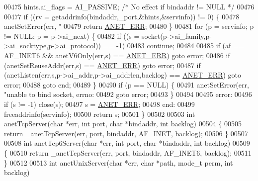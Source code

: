\begin{DoxyCode}
{{{{{{{{{{{{{{{{{{{{{{{00475     hints.ai\_flags = AI\_PASSIVE;    \textcolor{comment}{/* No effect if bindaddr != NULL */}
00476 
00477     \textcolor{keywordflow}{if} ((rv = getaddrinfo(bindaddr,\_port,&hints,&servinfo)) != 0) \{
00478         anetSetError(err, \textcolor{stringliteral}{"%
00479         \textcolor{keywordflow}{return} \hyperlink{anet_8h_a0697b7774a7e0f4ef141839fe93536fe}{ANET\_ERR};
00480     \}
00481     \textcolor{keywordflow}{for} (p = servinfo; p != NULL; p = p->ai\_next) \{
00482         \textcolor{keywordflow}{if} ((s = socket(p->ai\_family,p->ai\_socktype,p->ai\_protocol)) == -1)
00483             \textcolor{keywordflow}{continue};
00484 
00485         \textcolor{keywordflow}{if} (af == AF\_INET6 && anetV6Only(err,s) == \hyperlink{anet_8h_a0697b7774a7e0f4ef141839fe93536fe}{ANET\_ERR}) \textcolor{keywordflow}{goto} error;
00486         \textcolor{keywordflow}{if} (anetSetReuseAddr(err,s) == \hyperlink{anet_8h_a0697b7774a7e0f4ef141839fe93536fe}{ANET\_ERR}) \textcolor{keywordflow}{goto} error;
00487         \textcolor{keywordflow}{if} (anetListen(err,s,p->ai\_addr,p->ai\_addrlen,backlog) == \hyperlink{anet_8h_a0697b7774a7e0f4ef141839fe93536fe}{ANET\_ERR}) \textcolor{keywordflow}{goto} error;
00488         \textcolor{keywordflow}{goto} end;
00489     \}
00490     \textcolor{keywordflow}{if} (p == NULL) \{
00491         anetSetError(err, \textcolor{stringliteral}{"unable to bind socket, errno: %
00492         \textcolor{keywordflow}{goto} error;
00493     \}
00494 
00495 error:
00496     \textcolor{keywordflow}{if} (s != -1) close(s);
00497     s = \hyperlink{anet_8h_a0697b7774a7e0f4ef141839fe93536fe}{ANET\_ERR};
00498 end:
00499     freeaddrinfo(servinfo);
00500     \textcolor{keywordflow}{return} s;
00501 \}
00502 
00503 \textcolor{keywordtype}{int} anetTcpServer(\textcolor{keywordtype}{char} *err, \textcolor{keywordtype}{int} port, \textcolor{keywordtype}{char} *bindaddr, \textcolor{keywordtype}{int} backlog)
00504 \{
00505     \textcolor{keywordflow}{return} \_anetTcpServer(err, port, bindaddr, AF\_INET, backlog);
00506 \}
00507 
00508 \textcolor{keywordtype}{int} anetTcp6Server(\textcolor{keywordtype}{char} *err, \textcolor{keywordtype}{int} port, \textcolor{keywordtype}{char} *bindaddr, \textcolor{keywordtype}{int} backlog)
00509 \{
00510     \textcolor{keywordflow}{return} \_anetTcpServer(err, port, bindaddr, AF\_INET6, backlog);
00511 \}
00512 
00513 \textcolor{keywordtype}{int} anetUnixServer(\textcolor{keywordtype}{char} *err, \textcolor{keywordtype}{char} *path, mode\_t perm, \textcolor{keywordtype}{int} backlog)
}}}}}}}}}}}}}}}}}}}}}}}}}
\end{DoxyCode}
